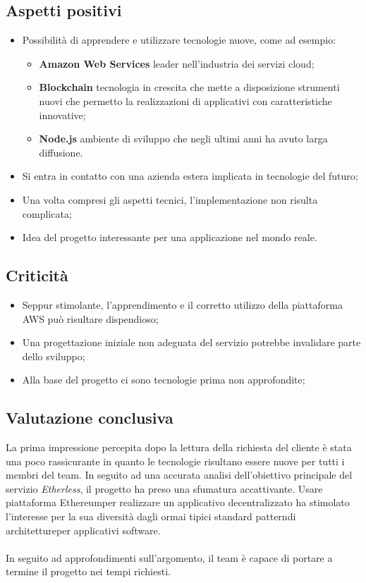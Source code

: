\subsection{Aspetti positivi}
\begin{itemize}
	\item Possibilità di apprendere e utilizzare tecnologie nuove, come ad esempio:
		\begin{itemize}
			\item \textbf{Amazon Web Services} leader nell'industria dei servizi cloud;
			\item \textbf{Blockchain\glo} tecnologia in crescita che mette a disposizione strumenti nuovi che permetto la realizzazioni di applicativi con caratteristiche innovative;
			\item \textbf{Node.js} ambiente di sviluppo che negli ultimi anni ha avuto larga diffusione.
		\end{itemize}
	\item Si entra in contatto con una azienda estera implicata in tecnologie del futuro;
	\item Una volta compresi gli aspetti tecnici, l'implementazione non risulta complicata;
	\item Idea del progetto interessante per una applicazione nel mondo reale.
\end{itemize}

\subsection{Criticità}
\begin{itemize}
	\item Seppur stimolante, l'apprendimento e il corretto utilizzo della piattaforma AWS può risultare dispendioso;
	\item Una progettazione iniziale non adeguata del servizio potrebbe invalidare parte dello sviluppo;
	\item Alla base del progetto ci sono tecnologie prima non approfondite;
\end{itemize}

\subsection{Valutazione conclusiva}
La prima impressione percepita dopo la lettura della richiesta del cliente è stata una poco rassicurante in quanto le tecnologie risultano essere nuove per tutti i membri del team. In seguito ad una accurata analisi dell'obiettivo principale del servizio \textit{Etherless}, il progetto ha preso una sfumatura accattivante. Usare piattaforma Ethereum\glo per realizzare un applicativo decentralizzato ha stimolato l'interesse per la sua diversità dagli ormai tipici standard pattern\glo di architetture\glo per applicativi software.
\\\\
In seguito ad approfondimenti sull'argomento, il team è capace di portare a termine il progetto nei tempi richiesti.